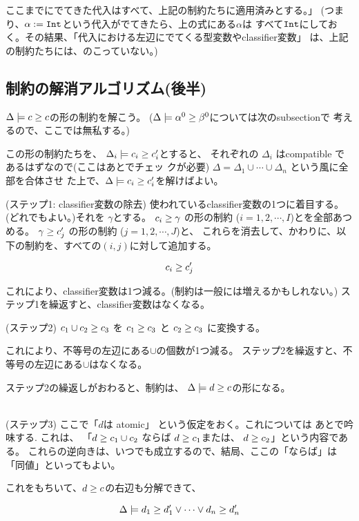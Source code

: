 \documentclass[dvipdfmx]{jsarticle}
\newcommand\longer[2]{{#1} \ord {#2}}
\newcommand\Int{\mbox{\texttt{Int}}}
\newcommand\uni{\cup} %
\begin{document}
ここまでにでてきた代入はすべて、上記の制約たちに適用済みとする。」
(つまり、$\alpha:=\Int$という代入がでてきたら、上の式にある$\alpha$は
すべて$\Int$にしておく。その結果、「代入における左辺にでてくる型変数やclassifier変数」
は、上記の制約たちには、のこっていない。)


\subsection{制約の解消アルゴリズム(後半)}

$\Delta \models \longer{c}{c}$の形の制約を解こう。
($\Delta \models \longer{\alpha^0}{\beta^0}$については次のsubsectionで
考えるので、ここでは無私する。)

この形の制約たちを、
$\Delta_i \models \longer{c_i}{c'_i}$とすると、
それぞれの $\Delta_i$ はcompatible であるはずなので(ここはあとでチェッ
クが必要)
$\Delta = \Delta_1 \cup \cdots \cup \Delta_n$ という風に全部を合体させ
た上で、$\Delta \models \longer{c_i}{c'_i}$を解けばよい。

(ステップ1: classifier変数の除去)
使われているclassifier変数の1つに着目する。(どれでもよい。)それを
$\gamma$とする。
$\longer{c_i}{\gamma}$ の形の制約 ($i=1,2,\cdots,I$)とを全部あつめる。
$\longer{\gamma}{c'_j}$ の形の制約 ($j=1,2,\cdots,J$)と、
これらを消去して、かわりに、以下の制約を、すべての$(i,j)$に対して追加する。

\[
  \longer{c_i}{c'_j}
\]

これにより、classifier変数は1つ減る。(制約は一般には増えるかもしれない。)
ステップ1を繰返すと、classifier変数はなくなる。

(ステップ2) $\longer{c_1 \uni c_2}{c_3}$ を
$\longer{c_1}{c_3}$ と
$\longer{c_2}{c_3}$ に変換する。

これにより、不等号の左辺にある$\uni$の個数が1つ減る。
ステップ2を繰返すと、不等号の左辺にある$\uni$はなくなる。

ステップ2の繰返しがおわると、制約は、
$\Delta \models \longer{d}{c}$の形になる。

\\
(ステップ3) ここで「$d$は atomic」 という仮定をおく。これについては
あとで吟味する.
これは、
「$\longer{d}{c_1 \uni c_2}$ ならば
$\longer{d}{c_1}$または、
$\longer{d}{c_2}$」という内容である。
これらの逆向きは、いつでも成立するので、結局、ここの「ならば」は「同値」といってもよい。

これをもちいて、$\longer{d}{c}$の右辺も分解できて、

\[
  \Delta \models \longer{d_1}{d_1'} \vee \cdots \vee \longer{d_n}{d'_n}
\]
\end{document}
